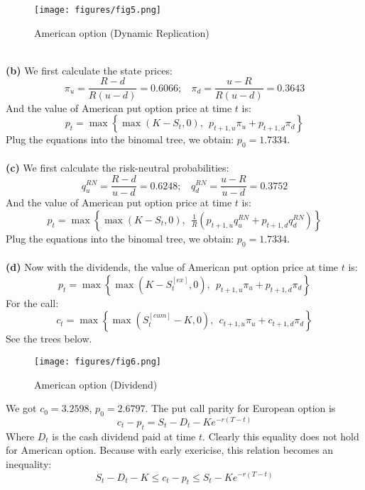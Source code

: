 \documentclass[10 pt]{hwtemplate} %
\begin{document}
\begin{solution}
\begin{figure}[H]
  \centering
  \captionsetup{justification=centering}
  \caption{\label{fig:q18pa}American option (Dynamic Replication)}
  \texttt{[image: figures/fig5.png]}
\end{figure}
~\\
\textbf{(b)} We first calculate the state prices:
\begin{equation}
  \pi_u = \frac{R-d}{R(u-d)} = 0.6066;~~~~  \pi_d = \frac{u-R}{R(u-d)} = 0.3643
\end{equation}
And the value of American put option price at time $t$ is:
\begin{equation}
  p_t = \max\left\{\max(K-S_t, 0), ~~p_{t+1, u}\pi_u + p_{t+1, d}\pi_d\right\}
\end{equation}
Plug the equations into the binomal tree, we obtain: $p_0 = 1.7334$.\\
~\\
\textbf{(c)} We first calculate the risk-neutral probabilities:
\begin{equation}
  q_u^{RN} = \frac{R-d}{u-d} = 0.6248;~~~~  q^{RN}_d = \frac{u-R}{u-d} = 0.3752
\end{equation}
And the value of American put option price at time $t$ is:
\begin{equation}
  p_t = \max\left\{\max(K-S_t, 0), ~~\tfrac{1}{R}\left(p_{t+1, u}q^{RN}_u + p_{t+1, d}q^{RN}_d\right)\right\}
\end{equation}
Plug the equations into the binomal tree, we obtain: $p_0 = 1.7334$.\\
~\\
\textbf{(d)} Now with the dividends, the value of American put option price at time $t$ is:
\begin{equation}
  p_t = \max\left\{\max(K-S_t^{[ex]}, 0), ~~p_{t+1, u}\pi_u + p_{t+1, d}\pi_d\right\}
\end{equation}
For the call:
\begin{equation}
  c_t = \max\left\{\max(S_t^{[cum]}-K, 0), ~~c_{t+1, u}\pi_u + c_{t+1, d}\pi_d\right\}
\end{equation}
See the trees below.
\begin{figure}[H]
  \centering
  \captionsetup{justification=centering}
  \caption{\label{fig:q19pb}American option (Dividend)}
  \texttt{[image: figures/fig6.png]}
\end{figure}
We got $c_0 = 3.2598$, $p_0=2.6797$. The put call parity for European option is
$$
c_t-p_t = S_t-D_t-Ke^{-r(T-t)}
$$
Where $D_t$ is the cash dividend paid at time $t$. Clearly this equality does not hold for American option. Because with early exericise, this relation becomes an inequality:
$$
S_t - D_t - K \leq c_t - p_t \leq S_t - Ke^{-r(T-t)}
$$
\end{solution}
\end{document}
